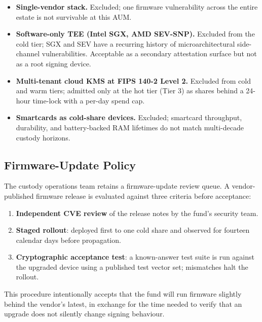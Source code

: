 \begin{itemize}[nosep]
\item \textbf{Single-vendor stack.} Excluded; one firmware vulnerability
across the entire estate is not survivable at this AUM.
\item \textbf{Software-only TEE (Intel SGX, AMD SEV-SNP).} Excluded
from the cold tier; SGX and SEV have a recurring history of
microarchitectural side-channel vulnerabilities. Acceptable as a
secondary attestation surface but not as a root signing device.
\item \textbf{Multi-tenant cloud KMS at FIPS 140-2 Level 2.} Excluded
from cold and warm tiers; admitted only at the hot tier (Tier 3) as
shares behind a 24-hour time-lock with a per-day spend cap.
\item \textbf{Smartcards as cold-share devices.} Excluded; smartcard
throughput, durability, and battery-backed RAM lifetimes do not match
multi-decade custody horizons.
\end{itemize}

\subsection{Firmware-Update Policy}

The custody operations team retains a firmware-update review queue.
A vendor-published firmware release is evaluated against three
criteria before acceptance:

\begin{enumerate}[nosep]
\item \textbf{Independent CVE review} of the release notes by the
fund's security team.
\item \textbf{Staged rollout}: deployed first to one cold share and
observed for fourteen calendar days before propagation.
\item \textbf{Cryptographic acceptance test}: a known-answer test
suite is run against the upgraded device using a published test
vector set; mismatches halt the rollout.
\end{enumerate}

This procedure intentionally accepts that the fund will run firmware
slightly behind the vendor's latest, in exchange for the time needed
to verify that an upgrade does not silently change signing behaviour.


